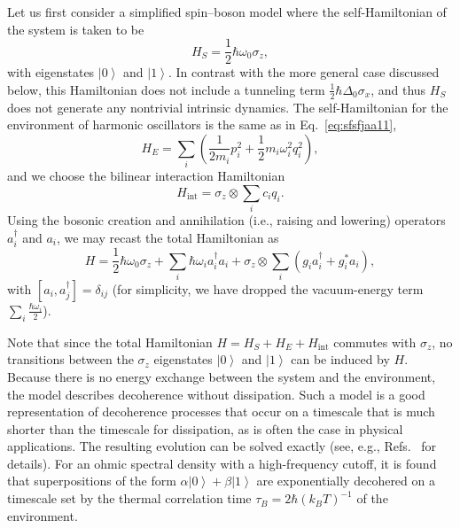 \documentclass[3p,sort&compress]{elsarticle}
\newcommand{\ket}[1]{\left\vert{#1}\right\rangle}
\newcommand{\op}[1]{#1}
\begin{document}
Let us first consider a simplified spin--boson model where the  self-Hamiltonian of the system is taken to be  
%
\begin{equation}
\op{H}_S = \frac{1}{2} \hbar\omega_0 \sigma_z,
\end{equation}
%
 with eigenstates $\ket{0}$ and $\ket{1}$. In contrast with the more general case discussed below, this Hamiltonian does not include a tunneling term $\frac{1}{2}\hbar \Delta_0 \sigma_x$, and thus $\op{H}_S$ does not generate any nontrivial intrinsic dynamics. The self-Hamiltonian for the environment of harmonic oscillators is the same as in Eq.~\eqref{eq:sfsfjaa11},
%
\begin{equation}
  \op{H}_E = \sum_i \left( \frac{1}{2m_i}p_i^2 +
  \frac{1}{2}m_i\omega_i^2q_i^2 \right),  
\end{equation}
%
 and we choose the bilinear interaction Hamiltonian 
%
\begin{equation}
\op{H}_\text{int} =   \sigma_z \otimes \sum_i c_i q_i.
\end{equation}
%
Using the bosonic creation and annihilation (i.e., raising and lowering) operators $a_i^\dagger$ and $a_i$, we may recast the total Hamiltonian as
%
\begin{equation}\label{eq:h-ssb}
  H =  \frac{1}{2}\hbar \omega_0 \sigma_z 
  + \sum_i \hbar\omega_i a_i^\dagger a_i + \sigma_z \otimes  \sum_i 
  \left( g_ia_i^\dagger + g_i^* a_i \right),
\end{equation}
%
with $[a_i, a_j^\dagger]=\delta_{ij}$ (for simplicity, we have dropped the vacuum-energy term $\sum_i \frac{\hbar\omega_i}{2}$).

Note that since the total Hamiltonian $H=H_S+H_E+H_\text{int}$ commutes with $\sigma_z$, no transitions between the $\sigma_z$ eigenstates $\ket{0}$ and $\ket{1}$ can be induced by $H$. Because there is no energy exchange between the system and the environment, the model describes decoherence without dissipation. Such a model is a good representation of decoherence processes that occur on a timescale that is much shorter than the timescale for dissipation, as is often the case in physical applications. The resulting evolution can be solved exactly (see, e.g., Refs.~\cite{Schlosshauer:2007:un,Hornberger:2009:aq} for details). For an ohmic spectral density with a high-frequency cutoff, it is found that superpositions of the form $\alpha\ket{0}+\beta\ket{1}$ are exponentially decohered on a timescale set by the thermal correlation time $\tau_B=2\hbar (k_B T)^{-1}$ of the environment.
\end{document}
